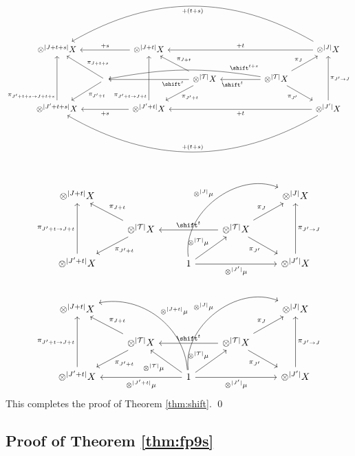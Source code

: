 \documentclass[12pt,oneside,pb-diagram]{article}
\begin{document}
%
\[\begin{tikzcd}
	\otimes^{|J+t+s|} X & & \otimes^{|J+t|} X \arrow[ll, "+s"'] & & & & \otimes^{|J|} X \arrow[llll, "+t"'] \arrow[llllll, "+(t+s)", bend right] \\
	& {} \arrow[lu, "\pi_{J+t+s}"'] \arrow[ld, "\pi_{J'+t}"] & & \otimes^{|\Time|} X \arrow[ld, "\pi_{J'+t}"] \arrow[lu, "\pi_{J+t}"'] \arrow[ll, pos=0.2, "\shift^s"] & & \otimes^{|\Time|} X \arrow[ll, pos=0.7, "\shift^t"] \arrow[rd, "\pi_{J'}"'] \arrow[ru, "\pi_J"] \arrow[llll, pos=0.2, "\shift^{t+s}"', bend right=10]  \\
	\otimes^{|J'+t+s|} X \arrow[uu, pos=0.1, "\pi_{J'+t+s \to J+t+s}"] & & \otimes^{|J'+t|} X \arrow[uu, pos=0.1, "\pi_{J'+t \to J+t}"] \arrow[ll, "+s"] & & & & \otimes^{|J'|} X \arrow[uu, "\pi_{J'\to J}"'] \arrow[llll, "+t"] \arrow[llllll, "+(t+s)"', bend left] 
\end{tikzcd}\]
%
%
\[\begin{tikzcd}
	\otimes^{|J+t|} X & & & & \otimes^{|J|} X \\
	& \otimes^{|\Time|} X \arrow[ld, "\pi_{J'+t}"] \arrow[lu, "\pi_{J+t}"'] & & \otimes^{|\Time|} X \arrow[rd, "\pi_{J'}"'] \arrow[ru, "\pi_J"] \arrow[ll, "\shift^t"'] & \\
	\otimes^{|J'+t|} X \arrow[uu, "\pi_{J'+t\to J+t}"] & & 1 \arrow[rr, "\otimes^{|J'|} \mu"'] \arrow[ru, "\otimes^{|\Time|} \mu"] \arrow[rruu, "\otimes^{|J|} \mu", bend left=60] & & \otimes^{|J'|} X \arrow[uu, "\pi_{J'\to J}"']
\end{tikzcd}\]
%
\[\begin{tikzcd}
	\otimes^{|J+t|} X & & & & \otimes^{|J|} X \\
	& \otimes^{|\Time|} X \arrow[ld, "\pi_{J'+t}"] \arrow[lu, "\pi_{J+t}"'] & & \otimes^{|\Time|} X \arrow[rd, "\pi_{J'}"'] \arrow[ru, "\pi_J"] \arrow[ll, "\shift^t"'] & \\
	\otimes^{|J'+t|} X \arrow[uu, "\pi_{J'+t\to J+t}"] & & 1 \arrow[rr, "\otimes^{|J'|} \mu"'] \arrow[ru, "\otimes^{|\Time|} \mu"] \arrow[rruu, "\otimes^{|J|} \mu", bend left=60] \arrow[lu, "\otimes^{|\Time|} \mu"] \arrow[ll, "\otimes^{|J'+t|} \mu"] \arrow[lluu, "\otimes^{|J+t|} \mu"', bend right=49] & & \otimes^{|J'|} X \arrow[uu, "\pi_{J'\to J}"']
\end{tikzcd}\]
%
This completes the proof of Theorem \ref{thm:shift}. \qed

\subsection{Proof of Theorem \ref{thm:fp9s}} \label{sec:proof:fp9s}
\end{document}
